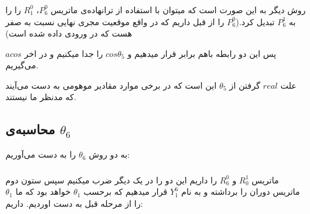 \documentclass{article}
\begin{document}
\subsubsection{}
روش دیگر به این صورت است که میتوان با استفاده از ترانهاده‌ی ماتریس $P_6^0$، $R_1^0$ را  را به $P_6^1$ تبدیل کرد.($P_6^0$ را از قبل داریم که در واقع موقعیت مجری نهایی نسبت به صفر هست که در ورودی داده شده است)
\begin{figure}[H]%
	\centering
    \caption{\label{fig:formula26}}
\end{figure}
\noindent
پس این دو رابطه باهم برابر قرار میدهیم و $cos \theta_5$ را جدا میکنیم و در اخر $acos$ می‌گیریم.
\begin{figure}[H]%
	\centering
    \caption{\label{fig:formula28}}
\end{figure}
\noindent
علت $real$  گرفتن از $\theta_5$ این است که در برخی موارد مقادیر موهومی به دست می‌آیند که مدنظر ما نیستند.


\subsection{محاسبه‌ی $\theta_6$}
به دو روش $\theta_6$ را به دست می‌آوریم:
\subsubsection{}
ماتریس $R_0^1$  و $R_6^0$  را داریم این دو را در یک دیگر ضرب میکنیم سپس ستون دوم ماتریس دوران را برداشته و به نام $Y_1^6$ قرار میدهیم که برحسب $\theta_1$ خواهد بود که ما  $\theta_1$ را از مرحله قبل به دست اوردیم. داریم:
\begin{figure}[H]%
	\centering
    \caption{\label{fig:formula29}}
\end{figure}
\end{document}
